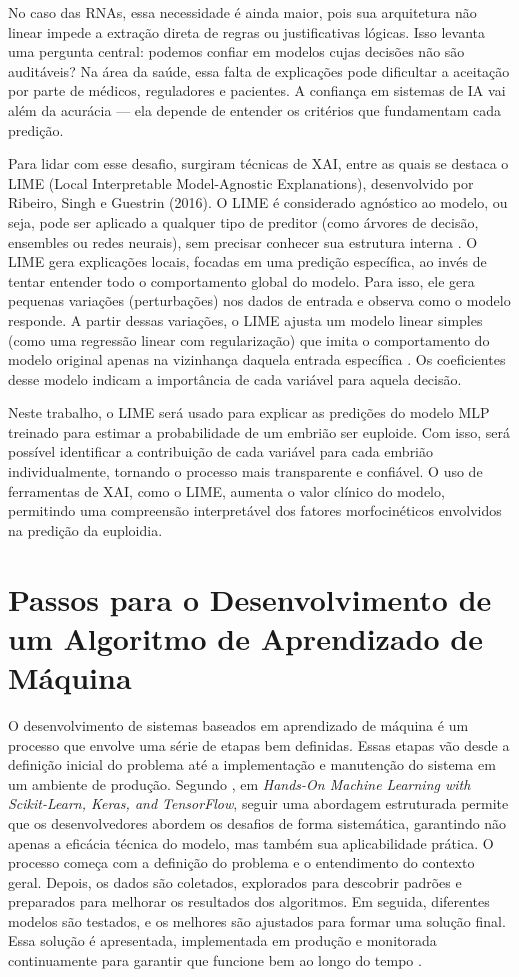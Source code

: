 No caso das RNAs, essa necessidade é ainda maior, pois sua arquitetura não linear impede a extração direta de regras ou justificativas lógicas. Isso levanta uma pergunta central: podemos confiar em modelos cujas decisões não são auditáveis? Na área da saúde, essa falta de explicações pode dificultar a aceitação por parte de médicos, reguladores e pacientes. A confiança em sistemas de IA vai além da acurácia — ela depende de entender os critérios que fundamentam cada predição.

Para lidar com esse desafio, surgiram técnicas de XAI, entre as quais se destaca o LIME (Local Interpretable Model-Agnostic Explanations), desenvolvido por Ribeiro, Singh e Guestrin (2016). O LIME é considerado agnóstico ao modelo, ou seja, pode ser aplicado a qualquer tipo de preditor (como árvores de decisão, ensembles ou redes neurais), sem precisar conhecer sua estrutura interna \cite{ribeiro2016}.
O LIME gera explicações locais, focadas em uma predição específica, ao invés de tentar entender todo o comportamento global do modelo. Para isso, ele gera pequenas variações (perturbações) nos dados de entrada e observa como o modelo responde. A partir dessas variações, o LIME ajusta um modelo linear simples (como uma regressão linear com regularização) que imita o comportamento do modelo original apenas na vizinhança daquela entrada específica \cite{ribeiro2016}. Os coeficientes desse modelo indicam a importância de cada variável para aquela decisão.

Neste trabalho, o LIME será usado para explicar as predições do modelo MLP treinado para estimar a probabilidade de um embrião ser euploide. Com isso, será possível identificar a contribuição de cada variável para cada embrião individualmente, tornando o processo mais transparente e confiável. O uso de ferramentas de XAI, como o LIME, aumenta o valor clínico do modelo, permitindo uma compreensão interpretável dos fatores morfocinéticos envolvidos na predição da euploidia.

\section{Passos para o Desenvolvimento de um Algoritmo de Aprendizado de Máquina}

O desenvolvimento de sistemas baseados em aprendizado de máquina é um processo que envolve uma série de etapas bem definidas. Essas etapas vão desde a definição inicial do problema até a implementação e manutenção do sistema em um ambiente de produção. Segundo , em \textit{Hands-On Machine Learning with Scikit-Learn, Keras, and TensorFlow}, seguir uma abordagem estruturada permite que os desenvolvedores abordem os desafios de forma sistemática, garantindo não apenas a eficácia técnica do modelo, mas também sua aplicabilidade prática. O processo começa com a definição do problema e o entendimento do contexto geral. Depois, os dados são coletados, explorados para descobrir padrões e preparados para melhorar os resultados dos algoritmos. Em seguida, diferentes modelos são testados, e os melhores são ajustados para formar uma solução final. Essa solução é apresentada, implementada em produção e monitorada continuamente para garantir que funcione bem ao longo do tempo \cite{geron2017}.

